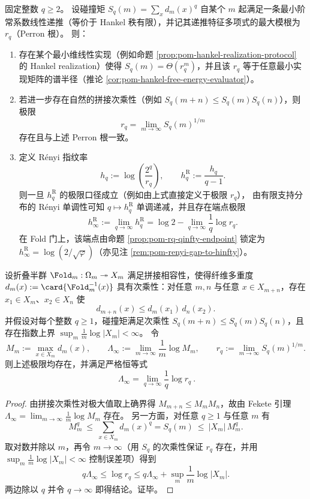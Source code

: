 \begin{proposition}\label{prop:pom-collision-renyi-perron-closure}
固定整数 \(q\ge 2\)。
设碰撞矩 \(S_q(m)=\sum_x d_m(x)^q\) 自某个 \(m\) 起满足一条最小阶常系数线性递推（等价于 Hankel 秩有限），并记其递推特征多项式的最大模根为 \(r_q\)（Perron 根）。
则：
\begin{enumerate}
  \item 存在某个最小维线性实现（例如命题 \ref{prop:pom-hankel-realization-protocol} 的 Hankel realization）使得
  \(
  S_q(m)=\Theta(r_q^m)
  \)，并且该 \(r_q\) 等于任意最小实现矩阵的谱半径（推论 \ref{cor:pom-hankel-free-energy-evaluator}）。
  \item 若进一步存在自然的拼接次乘性（例如 \(S_q(m+n)\le S_q(m)S_q(n)\)），则极限
  \[
  \boxed{\ r_q=\lim_{m\to\infty}S_q(m)^{1/m}\ }
  \]
  存在且与上述 Perron 根一致。
  \item 定义 Rényi 指纹率
  \[
  h_q:=\log\!\left(\frac{2^q}{r_q}\right),
  \qquad
  h_q^{\mathrm R}:=\frac{h_q}{q-1}.
  \]
  则一旦 \(h_q^{\mathrm R}\) 的极限口径成立（例如由上式直接定义于极限 \(r_q\)），
  由有限支持分布的 Rényi 单调性可知 \(q\mapsto h_q^{\mathrm R}\) 单调递减，并且存在端点极限
  \[
  h_\infty^{\mathrm R}:=\lim_{q\to\infty}h_q^{\mathrm R}
  =\log 2-\lim_{q\to\infty}\frac{1}{q}\log r_q.
  \]
  在 Fold 门上，该端点由命题 \ref{prop:pom-rq-qinfty-endpoint} 锁定为 \(h_\infty^{\mathrm R}=\log(2/\sqrt{\varphi})\)（亦见注 \ref{rem:pom-renyi-gap-to-hinfty}）。
\end{enumerate}
\end{proposition}

\begin{proposition}\label{prop:pom-maxfiber-exponent-equals-renyi-endpoint}
设折叠半群 \(\Fold_m:\Omega_m\twoheadrightarrow X_m\) 满足拼接相容性，使得纤维多重度
\(
d_m(x):=\card{\Fold_m^{-1}(x)}
\)
具有次乘性：对任意 \(m,n\) 与任意 \(x\in X_{m+n}\)，存在 \(x_1\in X_m\)、\(x_2\in X_n\) 使
\[
d_{m+n}(x)\le d_m(x_1)\,d_n(x_2).
\]
并假设对每个整数 \(q\ge 1\)，碰撞矩满足次乘性 \(S_q(m+n)\le S_q(m)S_q(n)\)，且存在指数上界
\(
\sup_m \frac{1}{m}\log|X_m|<\infty
\)。
令
\[
M_m:=\max_{x\in X_m} d_m(x),\qquad
\Lambda_\infty:=\lim_{m\to\infty}\frac{1}{m}\log M_m,\qquad
r_q:=\lim_{m\to\infty} S_q(m)^{1/m}.
\]
则上述极限均存在，并满足严格恒等式
\[
\boxed{\ \Lambda_\infty=\lim_{q\to\infty}\frac{1}{q}\log r_q\ }.
\]
\end{proposition}
\begin{proof}
由拼接次乘性对极大值取上确界得 \(M_{m+n}\le M_mM_n\)，故由 Fekete 引理 \(\Lambda_\infty=\lim_{m\to\infty}\frac{1}{m}\log M_m\) 存在。
另一方面，对任意 \(q\ge 1\) 与任意 \(m\) 有
\[
M_m^q\ \le\ \sum_{x\in X_m}d_m(x)^q=S_q(m)\ \le\ |X_m|\,M_m^q.
\]
取对数并除以 \(m\)，再令 \(m\to\infty\)（用 \(S_q\) 的次乘性保证 \(r_q\) 存在，并用 \(\sup_m \frac{1}{m}\log|X_m|<\infty\) 控制误差项）得到
\[
q\Lambda_\infty\le \log r_q\le q\Lambda_\infty+\sup_m\frac{1}{m}\log|X_m|.
\]
两边除以 \(q\) 并令 \(q\to\infty\) 即得结论。证毕。
\end{proof}

